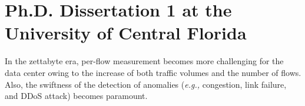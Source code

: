 \documentclass{NSF}
\newcommand{\eg}{{\em e.g.,}\xspace}
\begin{document}

\section{Ph.D. Dissertation 1 at the University of Central Florida}
In the zettabyte era, per-flow measurement becomes more challenging for the data center owing to the increase of both traffic volumes and the number of flows. Also, the swiftness of the detection of anomalies (\eg congestion, link failure, and DDoS attack) becomes paramount. 
\end{document}
